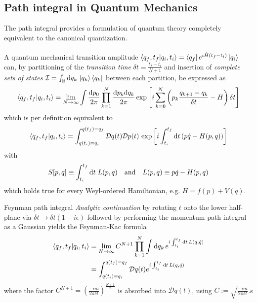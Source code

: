 \subsection{Path integral in Quantum Mechanics}
The path integral provides a formulation of quantum theory completely equivalent to the canonical quantization.\\
\\
A quantum mechanical transition amplitude $\braket{q_f,t_f}{q_i,t_i} = \bra{q_f} e^{i \hat{H}(t_f-t_i)} \ket{q_i}$ can, by partitioning of the \emph{transition time} $\delta t=\frac{t_f-t_i}{N+1}$ and insertion of \emph{complete sets of states} $\mathcal{I}= \int_{\mathbb{R}} \mathrm{d} q_k \, \ket{q_k}\bra{q_k}$ between each partition, be expressed as 
\begin{equation}
	\braket{q_f,t_f}{q_i,t_i} = \lim_{N\rightarrow\infty} \int \frac{\mathrm{d} p_0}{2 \pi} \prod_{k=1}^{N} \frac{\mathrm{d} p_k \mathrm{d} q_k}{2 \pi} \exp\left[i \sum_{k=0}^{N} \left(p_k \frac{q_{k+1}-q_k}{\delta t} - H\right) \delta t\right]
\end{equation}
which is per definition equivalent to
\begin{equation}
	\braket{q_f,t_f}{q_i,t_i} = \int_{q(t_i)=q_i}^{q(t_f)=q_f}  \mathcal{D}q(t) \mathcal{D}p(t) \, \exp\left[i\int_{t_i}^{t_f} \mathrm{d} t \left(p \dot{q} - H(p,q) \right)\right]
\end{equation}
with 
\begin{equation}
	S[p,q] \equiv \int_{t_i}^{t_f} \mathrm{d} t \; L(p,q) \quad \mathrm{and} \quad L(p,q) \equiv p \dot{q} - H(p,q)
\end{equation}
which holds true for every Weyl-ordered Hamiltonian, e.g. $H=f(p)+V(q)$.\\
\begin{mybox}{Feynman path integral}
	\emph{Analytic continuation} by rotating $t$ onto the lower half-plane via $\delta t \rightarrow \delta t (1-i \epsilon)$ followed by performing the momentum path integral as a Gaussian yields the Feynman-Kac formula
	\begin{align}
		\braket{q_f,t_f}{q_i,t_i} &= \lim_{N\rightarrow\infty} C^{N+1} \prod_{k=1}^{N} \int \mathrm{d} q_k \, e^{i \int_{t_i}^{t_f} \mathrm{d} t \, L(q,\dot{q})}\\
		&= \int_{q(t_i)=q_i}^{q(t_f)=q_f} \mathcal{D}q(t) e^{i \int_{t_i}^{t_f} \mathrm{d} t\, L(q,\dot{q})}\nonumber
	\end{align}
	where the factor $C^{N+1} = \left(\frac{-i m}{2 \pi \delta t}\right)^{\frac{N+1}{2}}$ is absorbed into $\mathcal{D}q(t)$, using $C:= \sqrt{\frac{-im}{2 \pi \delta t}}$.s
\end{mybox}

